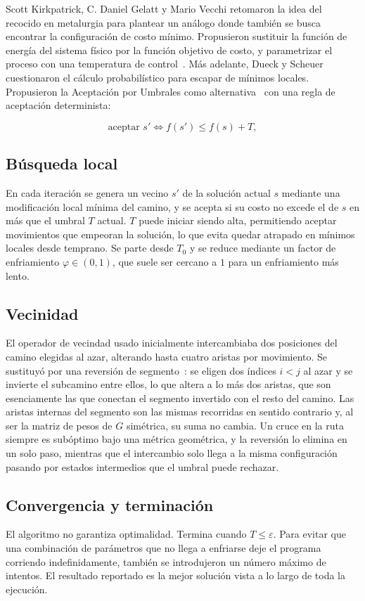 \documentclass[9pt,a4paper,twocolumn,twoside]{tau-class/tau}
\begin{document}
Scott Kirkpatrick, C. Daniel Gelatt y Mario Vecchi retomaron la idea del recocido en metalurgia para plantear un an\'alogo donde tambi\'en se busca encontrar la configuraci\'on de costo m\'inimo. Propusieron sustituir la función de energía del sistema físico por la función objetivo de costo, y parametrizar el proceso con una temperatura de control~\cite{kirkpatrick1983optimization}. M\'as adelante, Dueck y Scheuer cuestionaron el c\'alculo probabil\'istico para escapar de m\'inimos locales. Propusieron la Aceptaci\'on por Umbrales como alternativa~\cite{dueck1990threshold} con una regla de aceptaci\'on determinista:

\[
\text{aceptar } s' \iff f(s') \le f(s) + T,
\]


    \subsection{B\'usqueda local}

    En cada iteración se genera un vecino $s'$ de la solución actual $s$ mediante una modificación local mínima del camino, y se acepta si su costo no excede el de $s$ en más que el umbral $T$ actual. $T$ puede iniciar siendo alta, permitiendo aceptar movimientos que empeoran la solución, lo que evita quedar atrapado en m\'inimos locales desde temprano. Se parte desde $T_0$ y se reduce mediante un factor de enfriamiento $\varphi \in (0,1)$, que suele ser cercano a $1$ para un enfriamiento m\'as lento.

    \subsection{Vecinidad}
    El operador de vecindad usado inicialmente intercambiaba dos posiciones del camino elegidas al azar, alterando hasta cuatro aristas por movimiento. Se sustituyó por una reversión de segmento~\cite{croes1958method}: se eligen dos índices $i<j$ al azar y se invierte el subcamino entre ellos, lo que altera a lo más dos aristas, que son esenciamente las que conectan el segmento invertido con el resto del camino. Las aristas internas del segmento son las mismas recorridas en sentido contrario y, al ser la matriz de pesos de $G$ simétrica, su suma no cambia. Un cruce en la ruta siempre es subóptimo bajo una métrica geométrica, y la reversión lo elimina en un solo paso, mientras que el intercambio solo llega a la misma configuración pasando por estados intermedios que el umbral puede rechazar.

    \subsection{Convergencia y terminaci\'on}
    El algoritmo no garantiza optimalidad. Termina cuando $T \le \varepsilon$. Para evitar que una combinación de parámetros que no llega a enfriarse deje el programa corriendo indefinidamente, tambi\'en se introdujeron un n\'umero m\'aximo de intentos. El resultado reportado es la mejor solución vista a lo largo de toda la ejecuci\'on.
\end{document}
